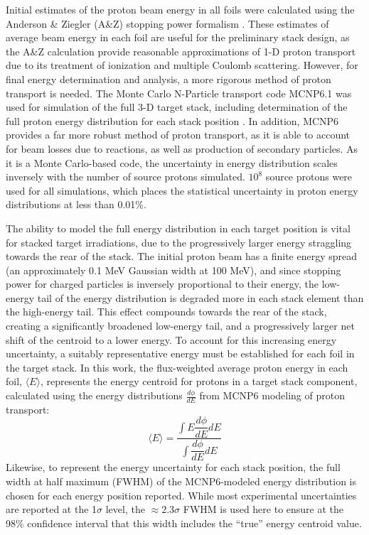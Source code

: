 \documentclass[3p]{elsarticle}
\begin{document}
Initial estimates of the proton beam energy in all foils were calculated using the Anderson \& Ziegler (A\&Z) stopping power formalism \cite{Andersen_Ziegler_1977,Ziegler1985,Ziegler1999}.
These estimates of average beam energy in each foil are useful for the preliminary stack design, as the A\&Z calculation provide reasonable approximations of 1-D proton transport due to its treatment of ionization and multiple Coulomb scattering. 
However, for final energy determination and analysis, a more rigorous method of proton transport is needed.
The Monte Carlo N-Particle transport code MCNP6.1 was used for simulation of the full 3-D target stack, including determination of the full proton energy distribution for each stack position   \cite{Goorley2012}.
In addition, MCNP6 provides a far more robust method of proton transport, as it is able to account for beam losses due to reactions, as well as production of secondary particles.
As it is a Monte Carlo-based code, the uncertainty in energy distribution scales inversely with the number of source protons simulated.  $10^8$ source protons were used for all simulations, which places the statistical uncertainty in proton energy distributions at less than 0.01\%.


The ability to model the full energy distribution in each target position is vital for stacked target irradiations, due to the progressively larger energy straggling towards the rear of the stack.
The initial proton beam has a finite energy spread (an approximately 0.1 MeV Gaussian width at 100 MeV), and since stopping power for charged particles is inversely proportional to their energy, the low-energy tail of the energy distribution is degraded more in each stack element than the high-energy tail.
This effect compounds  towards the rear of the stack, creating a significantly broadened low-energy tail, and a progressively larger net shift of the centroid to a lower energy. 
To account for this increasing energy uncertainty, a suitably representative energy must be established for  each foil in the target stack.
In this work, the flux-weighted average proton  energy in each foil, $\langle E \rangle$,  represents the energy centroid for protons in a target stack component, calculated using the energy distributions $\frac{d\phi}{dE}$ from MCNP6 modeling of proton transport:
\begin{equation}
\langle E \rangle = \dfrac{{\displaystyle\int E \dfrac{d\phi}{dE} dE}}{{\displaystyle\int \dfrac{d\phi}{dE} dE}}
\end{equation}
Likewise, to represent the energy uncertainty for each stack position, the full width at half maximum (FWHM) of the MCNP6-modeled energy distribution is chosen for each energy position reported.
While most experimental uncertainties are reported at the 1$\sigma$ level, the $\approx2.3\sigma$ FWHM is used here to ensure at the 98\% confidence interval that this width includes  the \enquote{true} energy centroid value.
\end{document}
